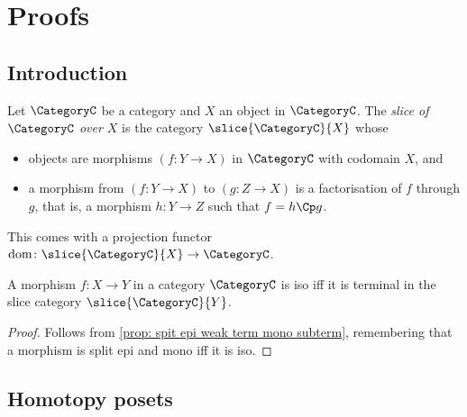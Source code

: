 \newpage
\section{Proofs}

\subsection{Introduction}

    \begin{definition}\label{dfn:slice_category}
        Let $\CategoryC$ be a category and $X$ an object in $\CategoryC$.
        The \emph{slice of $\CategoryC$ over $X$} is the category $\slice{\CategoryC}{X}$ whose
        \begin{itemize}
            \item objects are morphisms $(f\colon Y \to X)$ in $\CategoryC$ with codomain $X$, and
            \item a morphism from $(f\colon Y \to X)$ to $(g\colon Z \to X)$ is a factorisation of $f$ through $g$, that is, a morphism $h\colon Y \to Z$ such that $f = h\Cp g$.
        \end{itemize}
        This comes with a projection functor $\mathrm{dom}\colon \slice{\CategoryC}{X} \to \CategoryC$.
    \end{definition}

    \begingroup
    \def\theproposition{\ref{prop: iso if terminal in slice}}
    \begin{proposition}
        A morphism $f:X \to Y$ in a category $\CategoryC$ is iso iff it is terminal in the slice category $\slice{\CategoryC}{Y}$.
    \end{proposition}
    \addtocounter{proposition}{-1}
    \endgroup
    \begin{proof}
    Follows from \autoref{prop: spit epi weak term mono subterm}, remembering that a morphism is split epi and mono iff it is iso.
    \end{proof}


\subsection{Homotopy posets}

